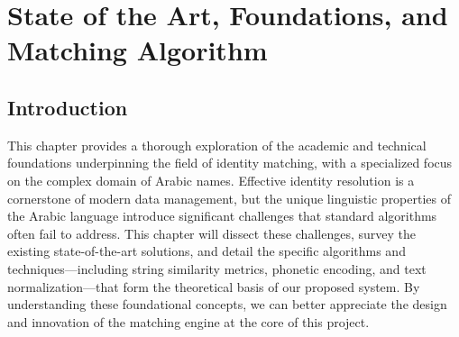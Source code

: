 \chapter{State of the Art, Foundations, and Matching Algorithm}

\section{Introduction}
This chapter provides a thorough exploration of the academic and technical foundations underpinning the field of identity matching, with a specialized focus on the complex domain of Arabic names. Effective identity resolution is a cornerstone of modern data management, but the unique linguistic properties of the Arabic language introduce significant challenges that standard algorithms often fail to address. This chapter will dissect these challenges, survey the existing state-of-the-art solutions, and detail the specific algorithms and techniques—including string similarity metrics, phonetic encoding, and text normalization—that form the theoretical basis of our proposed system. By understanding these foundational concepts, we can better appreciate the design and innovation of the matching engine at the core of this project.

